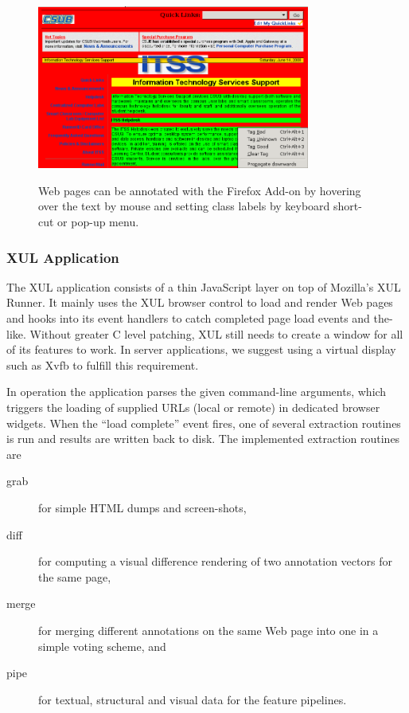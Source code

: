 \begin{figure}
	{\includegraphics[width=0.8\textwidth]{tut0}}
\caption{\label{f:tut0}Web pages can be annotated with the {\KrdWrd} Firefox Add-on by hovering over the text by mouse and setting class labels by keyboard short-cut or pop-up menu.}
\end{figure}


\subsubsection{XUL Application \label{app}}

The XUL application consists of a thin JavaScript layer on top of Mozilla's XUL Runner.
It mainly uses the XUL browser control to load and render Web pages and hooks into its event handlers to catch completed page load events and the-like.
Without greater C level patching, XUL still needs to create a window for all of its features to work.
In server applications, we suggest using a virtual display such as Xvfb to fulfill this requirement.

In operation the application parses the given command-line arguments, which triggers the loading of supplied URLs (local or remote) in dedicated browser widgets.
When the ``load complete'' event fires, one of several extraction routines is run and results are written back to disk.
The implemented extraction routines are 
\begin{description}
\item[grab] for simple HTML dumps and screen-shots,
\item[diff] for computing a visual difference rendering of two annotation vectors for the same page,
\item[merge\label{merge}] for merging different annotations on the same Web page into one in a simple voting scheme, and
\item[pipe] for textual, structural and visual data for the feature pipelines.
\end{description}

